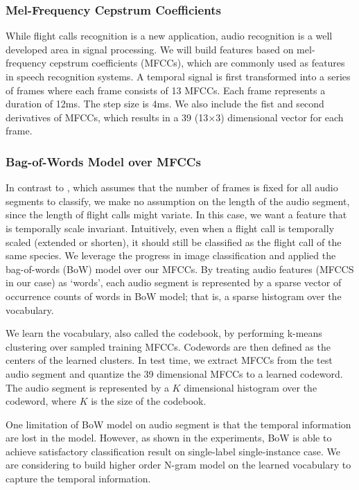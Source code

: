\documentclass{article} %
\begin{document}
\subsubsection{Mel-Frequency Cepstrum Coefficients }
While flight calls recognition is a new application, audio recognition is a well developed area in signal processing. We will build features based on  mel-frequency cepstrum coefficients (MFCCs), which are commonly used as features in speech recognition systems. A temporal signal is first transformed into a series of frames where each frame consists of 13 MFCCs. Each frame represents a duration of 12ms. The step size is 4ms. We also include the fist and second derivatives of MFCCs, which results in a 39 (13$\times$3) dimensional vector for each frame.

\subsubsection{Bag-of-Words Model over MFCCs}
\label{sec:bow}

In contrast to \cite{Dufour_NIPSW13}, which assumes that the number of frames is fixed for all audio segments to classify, we make no assumption on the length of the audio segment, since the length of flight calls might variate. In this case, we want a feature that is temporally scale invariant. Intuitively, even when a flight call is temporally scaled (extended or shorten), it should still be classified as the flight call of the same species. We leverage the progress in image classification and applied the bag-of-words (BoW) model \cite{Li_CVPR05} over our MFCCs. By treating audio features (MFCCS in our case) as `words', each audio segment is represented by a sparse vector of occurrence counts of words in BoW model; that is, a sparse histogram over the vocabulary.

We learn the vocabulary, also called the codebook, by performing k-means clustering over sampled training MFCCs. Codewords are then defined as the centers of the learned clusters. In test time, we extract MFCCs from the test audio segment and quantize the 39 dimensional MFCCs to a learned codeword. The audio segment is represented by a $K$ dimensional histogram over the codeword, where $K$ is the size of the codebook. 

One limitation of BoW model on audio segment is that the temporal information are lost in the model. However, as shown in the experiments, BoW is able to achieve satisfactory classification result on single-label single-instance case. We are considering to build higher order N-gram model on the learned vocabulary to capture the temporal information.
\end{document}
